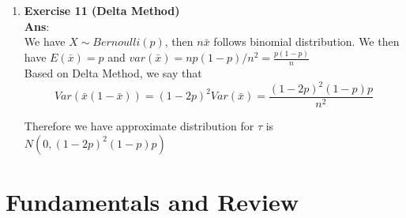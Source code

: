 \documentclass{article}
\begin{document}
\begin{enumerate}
\item \textbf{Exercise 11 (Delta Method)} \\
\textbf{Ans}: \\
We have $X\sim Bernoulli(p)$, then $n\bar x$ follows binomial distribution. We then have $E(\bar x)=p$ and $var(\bar x)=np(1-p)/n^2=\frac{p(1-p)}{n}$\\
Based on Delta Method, we say that $$
Var(\bar x(1-\bar x))=(1-2p)^2 Var(\bar x)=\frac{(1-2p)^2(1-p)p}{n^2}
$$

Therefore we have approximate distribution for $\tau$ is $N(0,(1-2p)^2(1-p)p )$

\end{enumerate}

\section{Fundamentals and Review} 
\end{document}

